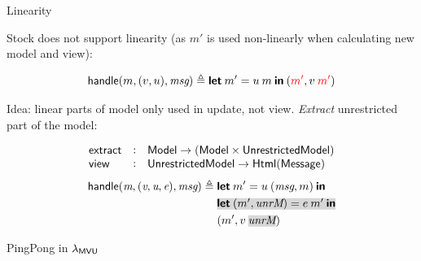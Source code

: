 \documentclass[11.5pt, aspectratio=169]{beamer}
\begin{document}
\begin{frame}{Linearity}

  \begin{fullpageitemize}
  \item Stock \mvu does not support linearity (as $m'$ is used non-linearly when calculating new model and view):
  \end{fullpageitemize}
  \[
    \mathsf{handle}(m, (v, u), \textit{msg}) \triangleq \textbf{\textsf{let}} \: m' = u \: m \: \textbf{\textsf{in}} \: ({\color{red}{m'}}, v \: {\color{red}{m'}})
  \]
  \begin{fullpageitemize}
  \itemR Idea: linear parts of model only used in update, not view. \emph{Extract} unrestricted part of the model:
  \end{fullpageitemize}
  \[
    \begin{array}{lcl}
      \mathsf{extract} & : & \mathsf{Model} \to (\mathsf{Model} \times \mathsf{UnrestrictedModel}) \\
      \mathsf{view}    & : & \mathsf{UnrestrictedModel} \to \mathsf{Html}(\mathsf{Message}) \\
    \end{array}
  \]
\[
\begin{array}{l}
  \handle{\textit{m}, (\textit{v}, \textit{u}, \textit{e}), \textit{msg}}
  \defeq
    \begin{aligned}[t]
      & \letintwo{m'}{u \app (\textit{msg}, m)} \\
      & \shade{\letintwo{(m', \textit{unrM})}{e \app m'}} \\
      & {(m', v \app \shade{\textit{unrM}})}
    \end{aligned}
  \end{array}
\]

\end{frame}


\begin{frame}{PingPong in $\lambda_{\mathsf{MVU}}$}
\end{frame}
\end{document}

